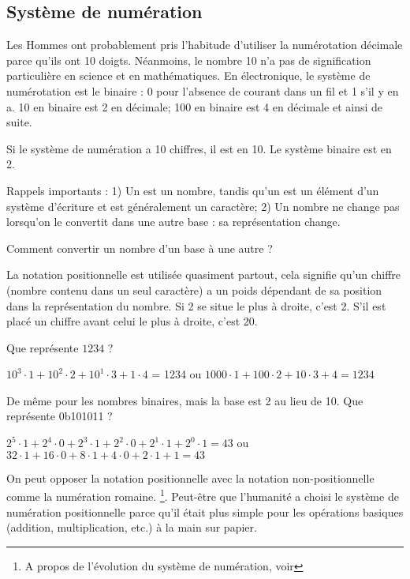 \subsection{Système de numération}

Les Hommes ont probablement pris l'habitude d'utiliser la numérotation décimale parce qu'ils ont 10 doigts.
Néanmoins, le nombre 10 n'a pas de signification particulière en science et en mathématiques.
En électronique, le système de numérotation est le binaire : 0 pour l'absence de courant dans un fil et 1 s'il y en a.
10 en binaire est 2 en décimale; 100 en binaire est 4 en décimale et ainsi de suite.

Si le système de numération a 10 chiffres, il est en  10. %
Le système binaire est en  2.

Rappels importants :
1) Un  est un nombre, tandis qu'un  est un élément d'un système d'écriture et est généralement un caractère;
2) Un nombre ne change pas lorsqu'on le convertit dans une autre base : sa représentation change.

Comment convertir un nombre d'un base à une autre ?

La notation positionnelle est utilisée quasiment partout, cela signifie qu'un chiffre (nombre contenu dans un seul caractère) a
 un poids dépendant de sa position dans la représentation du nombre.
Si 2 se situe le plus à droite, c'est 2.
S'il est placé un chiffre avant celui le plus à droite, c'est 20.

Que représente $1234$ ?

$10^3 \cdot 1 + 10^2 \cdot 2 + 10^1 \cdot 3 + 1 \cdot 4$ = 1234 ou 
$1000 \cdot 1 + 100 \cdot 2 + 10 \cdot 3 + 4 = 1234$

De même pour les nombres binaires, mais la base est 2 au lieu de 10.
Que représente 0b101011 ?

$2^5 \cdot 1 + 2^4 \cdot 0 + 2^3 \cdot 1 + 2^2 \cdot 0 + 2^1 \cdot 1 + 2^0 \cdot 1 = 43$ ou
$32 \cdot 1 + 16 \cdot 0 + 8 \cdot 1 + 4 \cdot 0 + 2 \cdot 1 + 1 = 43$

On peut opposer la notation positionnelle avec la notation non-positionnelle comme la numération romaine.
\footnote{A propos de l'évolution du système de numération, voir }.
Peut-être que l'humanité a choisi le système de numération positionnelle parce qu'il était plus simple pour les opérations basiques (addition, multiplication, etc.) à la main sur papier.


